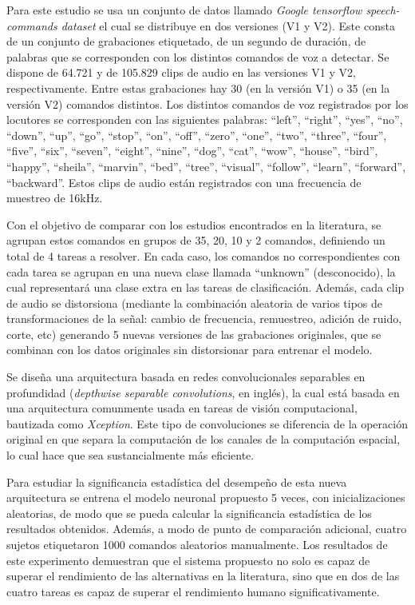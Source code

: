 Para este estudio se usa un conjunto de datos llamado \textit{Google tensorflow speech-commands dataset} el cual se distribuye en dos versiones (V1 y V2). Este consta de un conjunto de grabaciones etiquetado, de un segundo de duración, de palabras que se corresponden con los distintos comandos de voz a detectar. Se dispone de 64.721 y de 105.829 clips de audio en las versiones V1 y V2, respectivamente. Entre estas grabaciones hay 30 (en la versión V1) o 35 (en la versión V2) comandos distintos. Los distintos comandos de voz registrados por los locutores se corresponden con las siguientes palabras: ``left'', ``right'', ``yes'', ``no'', ``down'', ``up'', ``go'', ``stop'', ``on'', ``off'', ``zero'', ``one'', ``two'', ``three'', ``four'', ``five'', ``six'', ``seven'', ``eight'', ``nine'', ``dog'', ``cat'', ``wow'', ``house'', ``bird'', ``happy'', ``sheila'', ``marvin'', ``bed'', ``tree'', ``visual'', ``follow'', ``learn'', ``forward'', ``backward''. Estos clips de audio están registrados con una frecuencia de muestreo de 16kHz.

Con el objetivo de comparar con los estudios encontrados en la literatura, se agrupan estos comandos en grupos de 35, 20, 10 y 2 comandos, definiendo un total de 4 tareas a resolver. En cada caso, los comandos no correspondientes con cada tarea se agrupan en una nueva clase llamada ``unknown'' (desconocido), la cual representará una clase extra en las tareas de clasificación. Además, cada clip de audio se distorsiona (mediante la combinación aleatoria de varios tipos de transformaciones de la señal: cambio de frecuencia, remuestreo, adición de ruido, corte, etc) generando 5 nuevas versiones de las grabaciones originales, que se combinan con los datos originales sin distorsionar para entrenar el modelo.

Se diseña una arquitectura basada en redes convolucionales separables en profundidad (\textit{depthwise separable convolutions}, en inglés), la cual está basada en una arquitectura comunmente usada en tareas de visión computacional, bautizada como \textit{Xception}. Este tipo de convoluciones se diferencia de la operación original en que separa la computación de los canales de la computación espacial, lo cual hace que sea sustancialmente más eficiente. 

Para estudiar la significancia estadística del desempeño de esta nueva arquitectura se entrena el modelo neuronal propuesto 5 veces, con inicializaciones aleatorias, de modo que se pueda calcular la significancia estadística de los resultados obtenidos. Además, a modo de punto de comparación adicional, cuatro sujetos etiquetaron 1000 comandos aleatorios manualmente. Los resultados de este experimento demuestran que el sistema propuesto no solo es capaz de superar el rendimiento de las alternativas en la literatura, sino que en dos de las cuatro tareas es capaz de superar el rendimiento humano significativamente. 

